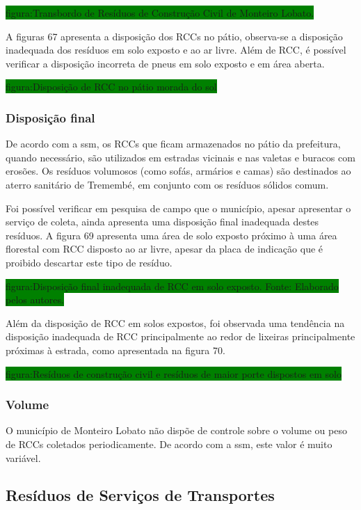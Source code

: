	\colorbox{green}{figura:Transbordo de Resíduos de Construção Civil de Monteiro Lobato.}
	
	A figuras 67 apresenta a disposição dos RCCs no pátio, observa-se a disposição inadequada dos resíduos em solo exposto e ao ar livre. Além de RCC, é possível verificar a disposição incorreta de pneus em solo exposto e em área aberta.
	
	\colorbox{green}{figura:Disposição de RCC no pátio morada do sol}
	
	\subsubsection{Disposição final}
	De acordo com a \gls{ssm}, os RCCs que ficam armazenados no pátio da prefeitura, quando necessário, são utilizados em estradas vicinais e nas valetas e buracos com erosões. Os resíduos volumosos (como sofás, armários e camas) são destinados ao aterro sanitário de Tremembé, em conjunto com os resíduos sólidos comum.
	
	Foi possível verificar em pesquisa de campo que o município, apesar apresentar o serviço de coleta, ainda apresenta uma disposição final inadequada destes resíduos. A figura 69 apresenta uma área de solo exposto próximo à uma área florestal com RCC disposto ao ar livre, apesar da placa de indicação que é proibido descartar este tipo de resíduo.
	
	\colorbox{green}{figura:Disposição final inadequada de RCC em solo exposto.  Fonte: Elaborado pelos autores.}
	
	Além da disposição de RCC em solos expostos, foi observada uma tendência na disposição inadequada de RCC principalmente ao redor de lixeiras principalmente próximas à estrada, como apresentada na figura 70.
	
	\colorbox{green}{figura:Resíduos de construção civil e resíduos de maior porte dispostos em solo}
	
	\subsubsection{Volume}
	O município de Monteiro Lobato não dispõe de controle sobre o volume ou peso de RCCs coletados periodicamente. De acordo com a \gls{ssm}, este valor é muito variável.
	
	
	\subsection{Resíduos de Serviços de Transportes}
	
